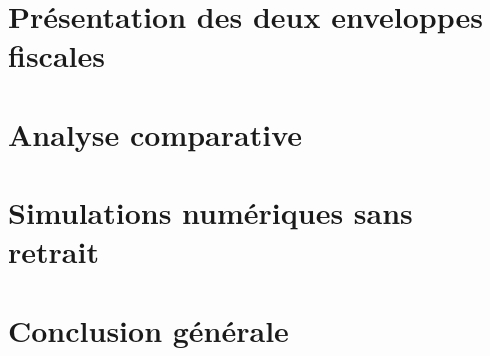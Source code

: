 \documentclass[a4paper, 11pt]{article}
\begin{document}
\pagestyle{fancy} %




\section{Présentation des deux enveloppes fiscales}
\label{sec:presentation}



\section{Analyse comparative}
\label{sec:analyse}





\section{Simulations numériques sans retrait}
\label{sec:simulations_sans_retrait}






% 


\section{Conclusion générale}




\end{document}
